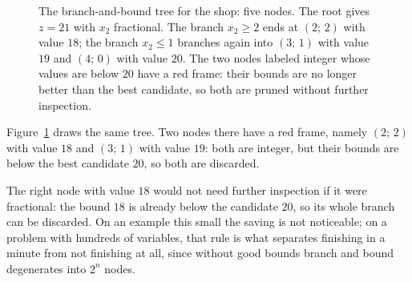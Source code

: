 \begin{figure}[!ht]
\centering
{}
\caption{The branch-and-bound tree for the shop: five nodes. The root gives $z=21$
with $x_{2}$ fractional. The branch $x_{2}\ge2$ ends at $(2;\,2)$ with value $18$; the branch
$x_{2}\le1$ branches again into $(3;\,1)$ with value $19$ and $(4;\,0)$ with value $20$.
The two nodes labeled integer whose values are below $20$ have a red frame: their bounds are no
longer better than the best candidate, so both are pruned without further inspection.}
\label{fig:ch22-pohon-percabangan}
\end{figure}

Figure~\ref{fig:ch22-pohon-percabangan} draws the same tree. Two nodes there
have a red frame, namely $(2;\,2)$ with value $18$ and $(3;\,1)$ with value $19$: both are
integer, but their bounds are below the best candidate $20$, so both are discarded.

The right node with value $18$ would not need further inspection if it were
fractional: the bound $18$ is already below the candidate $20$, so its whole branch can be
discarded. On an example this small the saving is not noticeable; on a problem with hundreds of
variables, that rule is what separates finishing in a minute from not finishing at all, since
without good bounds branch and bound degenerates into $2^{n}$ nodes.


